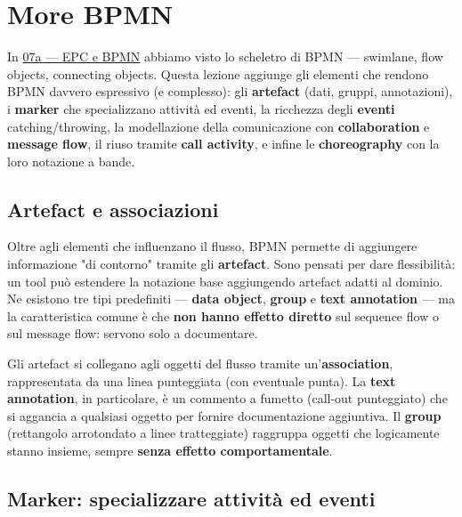\chapter{\texorpdfstring{More BPMN}{More BPMN}}
\label{ch:07b}

In \hyperref[ch:07a]{07a — EPC e BPMN} abbiamo visto lo scheletro di BPMN — swimlane, flow objects, connecting objects. Questa lezione aggiunge gli elementi che rendono BPMN davvero espressivo (e complesso): gli \textbf{artefact} (dati, gruppi, annotazioni), i \textbf{marker} che specializzano attività ed eventi, la ricchezza degli \textbf{eventi} catching/throwing, la modellazione della comunicazione con \textbf{collaboration} e \textbf{message flow}, il riuso tramite \textbf{call activity}, e infine le \textbf{choreography} con la loro notazione a bande.

\section{\texorpdfstring{Artefact e associazioni}{Artefact e associazioni}}

Oltre agli elementi che influenzano il flusso, BPMN permette di aggiungere informazione "di contorno" tramite gli \textbf{artefact}. Sono pensati per dare flessibilità: un tool può estendere la notazione base aggiungendo artefact adatti al dominio. Ne esistono tre tipi predefiniti — \textbf{data object}, \textbf{group} e \textbf{text annotation} — ma la caratteristica comune è che \textbf{non hanno effetto diretto} sul sequence flow o sul message flow: servono solo a documentare.

Gli artefact si collegano agli oggetti del flusso tramite un'\textbf{association}, rappresentata da una linea punteggiata (con eventuale punta). La \textbf{text annotation}, in particolare, è un commento a fumetto (call-out punteggiato) che si aggancia a qualsiasi oggetto per fornire documentazione aggiuntiva. Il \textbf{group} (rettangolo arrotondato a linee tratteggiate) raggruppa oggetti che logicamente stanno insieme, sempre \textbf{senza effetto comportamentale}.

\section{\texorpdfstring{Marker: specializzare attività ed eventi}{Marker: specializzare attività ed eventi}}

